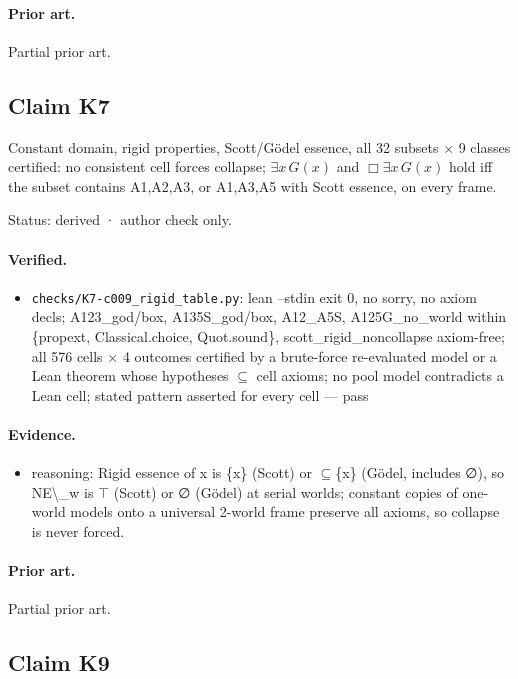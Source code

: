 \documentclass{article}
\begin{document}
\paragraph{Prior art.} Partial prior art.

\subsection*{Claim K7}

Constant domain, rigid properties, Scott/Gödel essence, all 32 subsets $\times$ 9 classes certified: no consistent cell forces collapse; $\exists x\,G(x)$ and $\Box\exists x\,G(x)$ hold iff the subset contains A1,A2,A3, or A1,A3,A5 with Scott essence, on every frame.

Status: derived · author check only.

\paragraph{Verified.}
\begin{itemize}
\item \texttt{checks/K7-c009\_rigid\_table.py}: lean --stdin exit 0, no sorry, no axiom decls; A123\_god/box, A135S\_god/box, A12\_A5S, A125G\_no\_world within \{propext, Classical.choice, Quot.sound\}, scott\_rigid\_noncollapse axiom-free; all 576 cells $\times$ 4 outcomes certified by a brute-force re-evaluated model or a Lean theorem whose hypotheses $\subseteq$ cell axioms; no pool model contradicts a Lean cell; stated pattern asserted for every cell --- pass
\end{itemize}

\paragraph{Evidence.}
\begin{itemize}
\item reasoning: Rigid essence of x is \{x\} (Scott) or $\subseteq$\{x\} (Gödel, includes ∅), so NE\textbackslash{}\_w is $\top$ (Scott) or ∅ (Gödel) at serial worlds; constant copies of one-world models onto a universal 2-world frame preserve all axioms, so collapse is never forced.
\end{itemize}

\paragraph{Prior art.} Partial prior art.

\subsection*{Claim K9}
\end{document}
